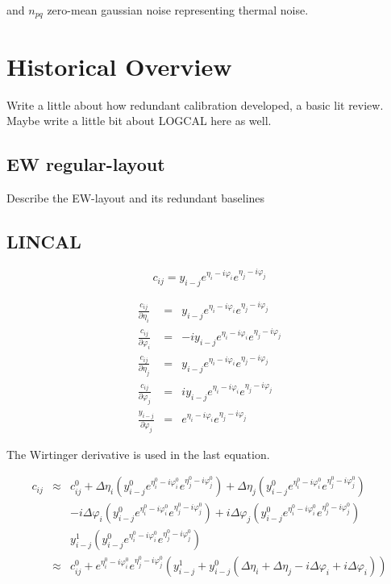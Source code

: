 \documentclass[a4paper,fleqn,usenatbib]{mnras}
\begin{document}
and $n_{pq}$ 
zero-mean gaussian noise representing thermal noise. 

\section{Historical Overview}

Write a little about how redundant calibration developed, a basic lit review.
Maybe write a little bit about LOGCAL here as well.

\subsection{EW regular-layout}
Describe the EW-layout and its redundant baselines

\subsection{LINCAL}
\begin{equation}
c_{ij} = y_{i-j} e^{\eta_i - i \varphi_i} e^{\eta_j - i \varphi_j}
\end{equation}

\begin{eqnarray}
\frac{c_{ij}}{\partial \eta_i} &=& y_{i-j} e^{\eta_i - i \varphi_i} e^{\eta_j - i \varphi_j}\\ 
\frac{c_{ij}}{\partial \varphi_i} &=&  -i y_{i-j} e^{\eta_i - i \varphi_i} e^{\eta_j - i \varphi_j}\\
\frac{c_{ij}}{\partial \eta_j} &=& y_{i-j} e^{\eta_i - i \varphi_i} e^{\eta_j - i \varphi_j}\\ 
\frac{c_{ij}}{\partial \varphi_j} &=&  i y_{i-j} e^{\eta_i - i \varphi_i} e^{\eta_j - i \varphi_j}\\
\frac{y_{i-j}}{\partial \varphi_j} &=&  e^{\eta_i - i \varphi_i} e^{\eta_j - i \varphi_j}
\end{eqnarray}

The Wirtinger derivative is used in the last equation.

\begin{eqnarray}
c_{ij} &\approx& c_{ij}^0 + \Delta \eta_i(y_{i-j}^0 e^{\eta_i^0 - i \varphi_i^0} e^{\eta_j^0 - i \varphi_j^0}) + \Delta \eta_j(y_{i-j}^0 e^{\eta_i^0 - i \varphi_i^0} e^{\eta_j^0 - i \varphi_j^0})\\
&& -i\Delta\varphi_i (y_{i-j}^0e^{\eta_i^0 - i \varphi_i^0} e^{\eta_j^0 - i \varphi_j^0}) +i\Delta\varphi_j (y_{i-j}^0e^{\eta_i^0 - i \varphi_i^0} e^{\eta_j^0 - i \varphi_j^0})\\
&& y_{i-j}^1(y_{i-j}^0e^{\eta_i^0 - i \varphi_i^0} e^{\eta_j^0 - i \varphi_j^0})\\
&\approx&  c_{ij}^0 + e^{\eta_i^0 - i \varphi_i^0} e^{\eta_j^0 - i \varphi_j^0}(y_{i-j}^1 + y_{i-j}^0( \Delta \eta_i+ \Delta \eta_j - i\Delta\varphi_i + i\Delta\varphi_i))
\end{eqnarray}
\end{document}
